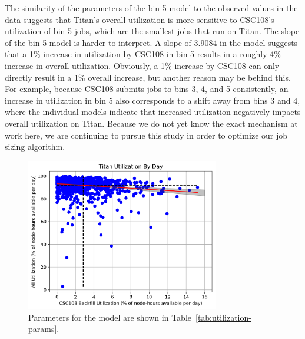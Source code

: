 The similarity of the parameters of the bin 5 model to the observed values in
the data suggests that Titan's overall utilization is more sensitive to
CSC108's utilization of bin 5 jobs, which are the smallest jobs that run on
Titan. The slope of the bin 5 model is harder to interpret. A slope of 3.9084
in the model suggests that a 1\% increase in utilization by CSC108 in bin 5
results in a roughly 4\% increase in overall utilization. Obviously, a 1\%
increase by CSC108 can only directly result in a 1\% overall increase, but
another reason may be behind this. For example, because CSC108 submits jobs to
bins 3, 4, and 5 consistently, an increase in utilization in bin 5 also
corresponds to a shift away from bins 3 and 4, where the individual models
indicate that increased utilization negatively impacts overall utilization on
Titan. Because we do not yet know the exact mechanism at work here, we are
continuing to pursue this study in order to optimize our job sizing algorithm.


\begin{figure}
  \includegraphics[width=0.75\textwidth]{images/linfit-utilization-by-true-day-all.png}
\caption{Parameters for the model are shown in
    Table~\ref{tab:utilization-params}.}
\label{fig:utilization-all}
\end{figure}


